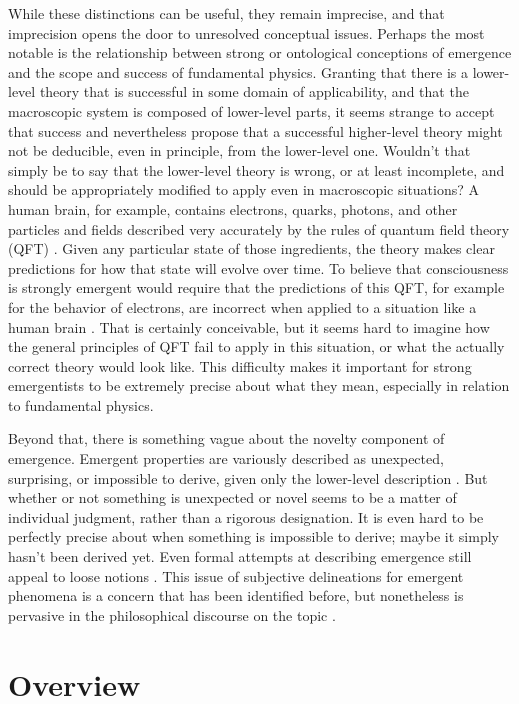 \documentclass[12pt,english]{article}
\newcommand{\autocite}{\cite}
\begin{document}
While these distinctions can be useful, they remain imprecise, and that imprecision opens the door to unresolved conceptual issues. 
Perhaps the most notable is the relationship between strong or ontological conceptions of emergence and the scope and success of fundamental physics.
Granting that there is a lower-level theory that is successful in some domain of applicability, and that the macroscopic system is composed of lower-level parts, it seems strange to accept that success and nevertheless propose that a successful higher-level theory might not be deducible, even in principle, from the lower-level one.
Wouldn't that simply be to say that the lower-level theory is wrong, or at least incomplete, and should be appropriately modified to apply even in macroscopic situations?
A human brain, for example, contains electrons, quarks, photons, and other particles and fields described very accurately by the rules of quantum field theory (QFT) \autocite{carroll2022quantum}.
Given any particular state of those ingredients, the theory makes clear predictions for how that state will evolve over time.
To believe that consciousness is strongly emergent would require that the predictions of this QFT, for example for the behavior of electrons, are incorrect when applied to a situation like a human brain \autocite{carroll2021consciousness}.
That is certainly conceivable, but it seems hard to imagine how the general principles of QFT fail to apply in this situation, or what the actually correct theory would look like.
This difficulty makes it important for strong emergentists to be extremely precise about what they mean, especially in relation to fundamental physics.

Beyond that, there is something vague about the novelty component of emergence. 
Emergent properties are variously described as unexpected, surprising, or impossible to derive, given only the lower-level description \autocite{Bedau1997-BEDWE}.
But whether or not something is unexpected or novel seems to be a matter of individual judgment, rather than a rigorous designation. 
It is even hard to be perfectly precise about when something is impossible to derive; maybe it simply hasn't been derived yet. Even formal attempts at describing emergence still appeal to loose notions \autocite{Fletcher2021}. This issue of subjective delineations for emergent phenomena is a concern that has been identified before, but nonetheless is pervasive in the philosophical discourse on the topic \autocite{Taylor2015}.

\section*{Overview}
\end{document}
